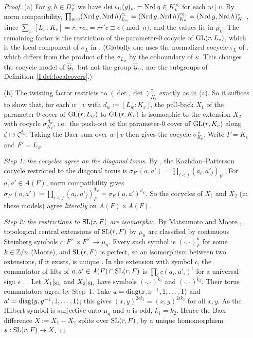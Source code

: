 \begin{proof}
(a) For $g,h\in D_v^\times$ we have $\det\iota_D(g)_w=\operatorname{Nrd} g\in K_v^\times$ for each $w\mid v$. By norm compatibility, $\prod_{w\mid v}(\operatorname{Nrd} g,\operatorname{Nrd} h)_{L_w}^{c_v}=(\operatorname{Nrd} g,\operatorname{Nrd} h)_{K_v}^{rc_v}=(\operatorname{Nrd} g,\operatorname{Nrd} h)_{K_v}^{c}$, since $\sum_w[L_w:K_v]=r$, $rc_v=rr'c\equiv c\pmod n$, and the values lie in $\mu_n$. The remaining factor is the restriction of the parameter-$0$ cocycle of $\mathrm{GL}(r,L_v)$, which is the local component of $\sigma_L$ in \cite[equation~(4)]{JC26a}. (Globally one uses the normalized cocycle $\tau_L$ of \cite[\S2]{FK86}, which differs from the product of the $\sigma_{L_w}$ by the coboundary of $\kappa$. This changes the cocycle model of $\overline{\mathcal{G}}_v$ but not the group $\overline{\mathcal{G}}_v$, nor the subgroups of Definition~\ref{I:def:localcovers}.)

(b) The twisting factor restricts to $(\det,\det)_{K_v}^{c}$ exactly as in (a). So it suffices to show that, for each $w\mid v$ with $d_w:=[L_w:K_v]$, the pull-back $X_1$ of the parameter-$0$ cover of $\mathrm{GL}(r,L_w)$ to $\mathrm{GL}(r,K_v)$ is isomorphic to the extension $X_2$ with cocycle $\sigma_{K_v}^{\,d_w}$, i.e.\ the push-out of the parameter-$0$ cover of $\mathrm{GL}(r,K_v)$ along $\zeta\mapsto\zeta^{d_w}$. Taking the Baer sum over $w\mid v$ then gives the cocycle $\sigma_{K_v}^{\,r}$. Write $F=K_v$ and $F'=L_w$.

\emph{Step 1: the cocycles agree on the diagonal torus.} By \cite[\S2]{FK86}, the Kazhdan--Patterson cocycle restricted to the diagonal torus is $\sigma_{F'}(a,a')=\prod_{i<j}(a_i,a'_j)_{F'}$. For $a,a'\in A(F)$, norm compatibility gives $\sigma_{F'}(a,a')=\prod_{i<j}(a_i,a'_j)_F^{d_w}=\sigma_F(a,a')^{d_w}$. So the cocycles of $X_1$ and $X_2$ (in these models) agree \emph{literally} on $A(F)\times A(F)$.

\emph{Step 2: the restrictions to $\mathrm{SL}(r,F)$ are isomorphic.} By Matsumoto and Moore \cite{Mat69}, \cite{Moo68}, topological central extensions of $\mathrm{SL}(r,F)$ by $\mu_n$ are classified by continuous Steinberg symbols $c:F^\times\times F^\times\to\mu_n$. Every such symbol is $(\cdot,\cdot)_F^{k}$ for some $k\in\mathbb{Z}/n$ (Moore), and $\mathrm{SL}(r,F)$ is perfect, so an isomorphism between two extensions, if it exists, is unique \Ev. In the extension with symbol $c$, the commutator of lifts of $a,a'\in A(F)\cap\mathrm{SL}(r,F)$ is $\prod_ic(a_i,a'_i)^{\epsilon}$ for a universal sign $\epsilon$ \cite[\S5]{Mat69}, \cite[\S\S8--9]{Mil71} \Ev. Let $X_1|_{\mathrm{SL}}$ and $X_2|_{\mathrm{SL}}$ have symbols $(\cdot,\cdot)^{k_1}$ and $(\cdot,\cdot)^{k_2}$. Their torus commutators agree by Step~1. Take $a=\operatorname{diag}(x,x^{-1},1,\dots,1)$ and $a'=\operatorname{diag}(y,y^{-1},1,\dots,1)$; this gives $(x,y)^{2\epsilon k_1}=(x,y)^{2\epsilon k_2}$ for all $x,y$. As the Hilbert symbol is surjective onto $\mu_n$ and $n$ is odd, $k_1=k_2$. Hence the Baer difference $X:=X_1-X_2$ splits over $\mathrm{SL}(r,F)$, by a unique homomorphism $s:\mathrm{SL}(r,F)\to X$.


\end{proof}
